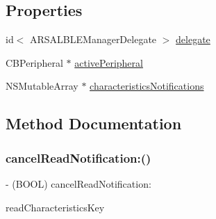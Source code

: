 \subsection*{Properties}
\begin{DoxyCompactItemize}
\item 
id$<$ A\+R\+S\+A\+L\+B\+L\+E\+Manager\+Delegate $>$ \hyperlink{interfaceARSAL__BLEManager_aead3a29e0e0fc9a1dff3bb3f9474dca3}{delegate}
\item 
C\+B\+Peripheral $\ast$ \hyperlink{interfaceARSAL__BLEManager_a2f71424c0b4e400656bdde9be78ad741}{active\+Peripheral}
\item 
N\+S\+Mutable\+Array $\ast$ \hyperlink{interfaceARSAL__BLEManager_ae326962fee96bf58f374fb7d4f3d2260}{characteristics\+Notifications}
\end{DoxyCompactItemize}


\subsection{Method Documentation}
\hypertarget{interfaceARSAL__BLEManager_ab9712e7ca6da641483664d1ebdfbc690}{}\label{interfaceARSAL__BLEManager_ab9712e7ca6da641483664d1ebdfbc690} 
\subsubsection{\texorpdfstring{cancel\+Read\+Notification\+:()}{cancelReadNotification:()}}
{\footnotesize\ttfamily -\/ (B\+O\+OL) cancel\+Read\+Notification\+: \begin{DoxyParamCaption}\item[{(N\+S\+String $\ast$)}]{read\+Characteristics\+Key }\end{DoxyParamCaption}}

\hypertarget{interfaceARSAL__BLEManager_ad4f53997e9972a69ea5d33907f58a08c}{}\label{interfaceARSAL__BLEManager_ad4f53997e9972a69ea5d33907f58a08c} 
